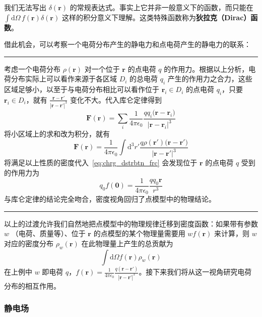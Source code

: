 \documentclass[cn,10pt,math=newtx,citestyle=gb7714-2015,bibstyle=gb7714-2015]{elegantbook}
\def\bm{\boldsymbol}
\def\d{\mathrm d}
\def\srule{\noindent\rule{\linewidth}{0.3mm}}
\begin{document}
我们无法写出 $\delta(\bm r)$ 的常规表达式。事实上它并非一般意义下的函数，而只能在 $\int\d\Omega\,f(\bm r)\delta(\bm r)$ 这样的积分意义下理解。这类特殊函数称为\textbf{狄拉克（Dirac）函数}。

借此机会，可以考察一个电荷分布产生的静电力和点电荷产生的静电力的联系：

\srule

\begin{instance}[电荷分布产生的静电力]
    考虑一个电荷分布 $\rho(\bm r)$ 对一个位于 $\bm r$ 的点电荷 $q$ 的作用力。根据以上分析，电荷分布实际上可以看作来源于各区域 $D_i$ 的总电荷 $q_i$ 产生的作用力之合力，这些区域足够小，以至于与电荷分布相比可以看作位于 $\bm r_i\in D_i$ 的点电荷 $q_i$，只要 $\bm r_i\in D_i$，就有 $\frac{\bm r-\bm r'}{|\bm r-\bm r'|^3}$ 变化不大。代入库仑定律得到
    \begin{equation*}
        \bm F(\bm r) = \sum_i \frac{1}{4\pi\epsilon_0}\frac{qq_i\bm (\bm r-\bm r_i)}{|\bm r-\bm r_i|^3} 
    \end{equation*}
    将小区域上的求和改为积分，就有
    \begin{equation}\label{eq:chrg_dstrbtn_frc}
        \bm F(\bm r)= \frac{1}{4\pi\epsilon_0}\int\d^3 r'\frac{q\rho(\bm r')\bm (\bm r-\bm r')}{|\bm r-\bm r'|^3}
    \end{equation}
    将满足以上性质的密度代入~\ref{eq:chrg_dstrbtn_frc} 会发现位于 $\bm r$ 的点电荷 $q$ 受到的作用力为 
\begin{equation*}
    q_0f(\bm 0)=\frac{1}{4\pi\epsilon_0}\frac{qq_0\bm r}{r^3}
\end{equation*}
与库仑定律的结论完全吻合，密度视角回归了点模型中的物理结论。
\end{instance}

\srule

以上的过渡允许我们自然地把点模型中的物理规律迁移到密度函数：如果带有参数 $w$ （电荷、质量等）、位于 $\bm r$ 的点模型的某个物理量需要用 $wf(\bm r)$ 来计算，则 $w$ 对应的密度分布 $\rho_w(\bm r)$ 在此物理量上产生的总贡献为
\begin{equation}\label{eq:dnsty_cntrbtn}
    \int\d \Omega f(\bm r)\rho_w(\bm r)
\end{equation}
在上例中 $w$ 即电荷 $q$，$f(\bm r)=\frac{1}{4\pi\epsilon_0}\frac{q(\bm r-\bm r')}{|\bm r-\bm r'|^3}$。接下来我们将从这一视角研究电荷分布的相互作用。

\subsubsection{静电场}
\end{document}
